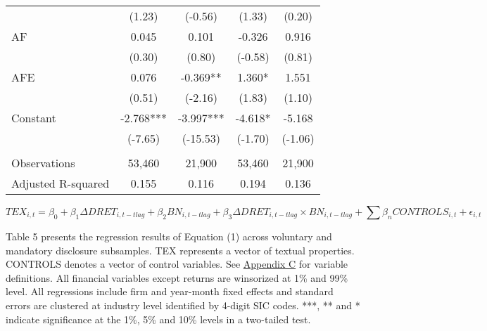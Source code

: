 \begin{table}[H]
\begin{center}
\begin{tabular}{lcccc}
			& (1.23) & (-0.56) & (1.33) & (0.20) \\
			AF & 0.045 & 0.101 & -0.326 & 0.916 \\
			& (0.30) & (0.80) & (-0.58) & (0.81) \\
			AFE & 0.076 & -0.369** & 1.360* & 1.551 \\
			& (0.51) & (-2.16) & (1.83) & (1.10) \\
			Constant & -2.768*** & -3.997*** & -4.618* & -5.168 \\
			& (-7.65) & (-15.53) & (-1.70) & (-1.06) \\
			&   &   &   &  \\
			Observations & 53,460 & 21,900 & 53,460 & 21,900 \\
			Adjusted R-squared & 0.155 & 0.116 & 0.194 & 0.136 \\
			\bottomrule
			\bottomrule
		\end{tabular}%
	\end{center}
		\begin{footnotesize}
			\setcounter{equation}{0}
			\begin{equation}
				TEX_{i,t}=\beta_0+\beta_1\Delta DRET_{i,t-tlag}+\beta_2BN_{i,t-tlag}+\beta_3\Delta DRET_{i,t-tlag}\times 		BN_{i,t-tlag}+\sum\beta_nCONTROLS_{i,t}+\epsilon_{i,t}
			\end{equation}
			
			\noindent Table 5 presents the regression results of Equation (1) across voluntary and mandatory disclosure subsamples. TEX represents a vector of textual properties. CONTROLS denotes a vector of control variables. See \hyperref[appc]{Appendix C} for variable definitions. All financial variables except returns are winsorized at 1\% and 99\% level. All regressions include firm and year-month fixed effects and standard errors are clustered at industry level identified by 4-digit SIC codes. ***, ** and * indicate significance at the 1\%, 5\% and 10\% levels in a two-tailed test.
		\end{footnotesize}
\end{table}%